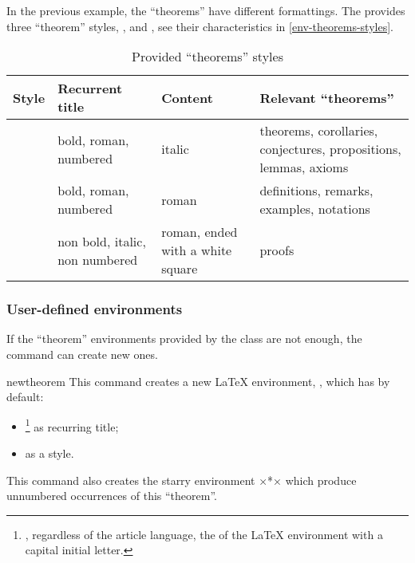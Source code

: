 \documentclass[english,nolocaltoc]{nwejmart}
\newtheorem[style=definition]{fact}
\newtheorem[title=experience]{experience}
\newtheorem[title-plural=rings]{ring}
\newtheorem[title=ideal,title-plural=ideals]{ideal}
\begin{document}
In the previous example, the \enquote{theorems} have different
formattings. The \nwejmauthorcl{} provides three \enquote{theorem}
styles, ,  and
, see their characteristics in 
\vref{env-theorems-styles}.

\begin{table}
  \centering
  \begin{tabulary}{\linewidth}{lLLL}
    Style                 & Recurrent title                  & Content
    & Relevant \enquote{theorems}               \\\toprule
        & bold, roman, numbered           & italic
                                                                                                  & theorems, corollaries, conjectures, propositions, lemmas, axioms \\\midrule
     & bold, roman, numbered            & roman                             & definitions, remarks, examples, notations \\\midrule
          & non bold, italic, non numbered & roman,
                                                             ended
                                                             with a
                                                             white square & proofs                                     \\\bottomrule
  \end{tabulary}
  \caption{Provided \enquote{theorems} styles}
  \label{env-theorems-styles}
\end{table}

\subsubsection{User-defined environments}
\label{sec:envir-de-type-1}

If the \enquote{theorem} environments provided by the  class are not
enough, the  command can create new ones.

\begin{docCommand}{newtheorem}{}
  This command creates a new \LaTeX{} environment, , which
  has by default:
  \begin{itemize}
  \item {}\footnote{\Ie*{}, regardless of the article
      language,  the  of the \LaTeX{} environment with a
      capital initial letter.}  as recurring title;
  \item {} as a style.
  \end{itemize}
  This command also creates the starry environment  ×*×
  which produce unnumbered occurrences of this \enquote{theorem}.
  \end{docCommand}
\end{document}
